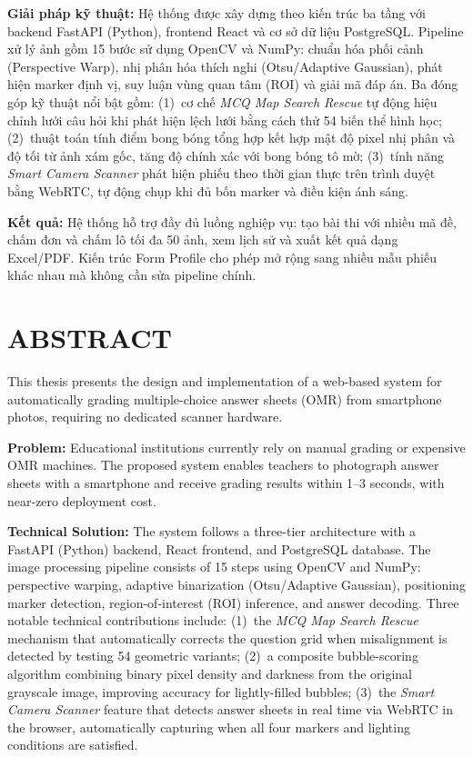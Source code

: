 \textbf{Giải pháp kỹ thuật:} Hệ thống được xây dựng theo kiến trúc ba tầng với backend FastAPI (Python), frontend React và cơ sở dữ liệu PostgreSQL. Pipeline xử lý ảnh gồm 15 bước sử dụng OpenCV và NumPy: chuẩn hóa phối cảnh (Perspective Warp), nhị phân hóa thích nghi (Otsu/Adaptive Gaussian), phát hiện marker định vị, suy luận vùng quan tâm (ROI) và giải mã đáp án. Ba đóng góp kỹ thuật nổi bật gồm: (1)~cơ chế \textit{MCQ Map Search Rescue} tự động hiệu chỉnh lưới câu hỏi khi phát hiện lệch lưới bằng cách thử 54 biến thể hình học; (2)~thuật toán tính điểm bong bóng tổng hợp kết hợp mật độ pixel nhị phân và độ tối từ ảnh xám gốc, tăng độ chính xác với bong bóng tô mờ; (3)~tính năng \textit{Smart Camera Scanner} phát hiện phiếu theo thời gian thực trên trình duyệt bằng WebRTC, tự động chụp khi đủ bốn marker và điều kiện ánh sáng.

\textbf{Kết quả:} Hệ thống hỗ trợ đầy đủ luồng nghiệp vụ: tạo bài thi với nhiều mã đề, chấm đơn và chấm lô tối đa 50 ảnh, xem lịch sử và xuất kết quả dạng Excel/PDF. Kiến trúc Form Profile cho phép mở rộng sang nhiều mẫu phiếu khác nhau mà không cần sửa pipeline chính.

\clearpage
\chapter*{ABSTRACT}

This thesis presents the design and implementation of a web-based system for automatically grading multiple-choice answer sheets (OMR) from smartphone photos, requiring no dedicated scanner hardware.

\textbf{Problem:} Educational institutions currently rely on manual grading or expensive OMR machines. The proposed system enables teachers to photograph answer sheets with a smartphone and receive grading results within 1--3 seconds, with near-zero deployment cost.

\textbf{Technical Solution:} The system follows a three-tier architecture with a FastAPI (Python) backend, React frontend, and PostgreSQL database. The image processing pipeline consists of 15 steps using OpenCV and NumPy: perspective warping, adaptive binarization (Otsu/Adaptive Gaussian), positioning marker detection, region-of-interest (ROI) inference, and answer decoding. Three notable technical contributions include: (1)~the \textit{MCQ Map Search Rescue} mechanism that automatically corrects the question grid when misalignment is detected by testing 54 geometric variants; (2)~a composite bubble-scoring algorithm combining binary pixel density and darkness from the original grayscale image, improving accuracy for lightly-filled bubbles; (3)~the \textit{Smart Camera Scanner} feature that detects answer sheets in real time via WebRTC in the browser, automatically capturing when all four markers and lighting conditions are satisfied.

